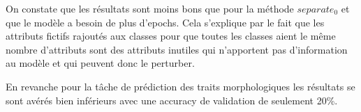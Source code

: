 \documentclass[a4paper]{article}
\begin{document}
On constate que les résultats sont moins bons que pour la méthode $separate_0$ et que le modèle a besoin de 
plus d'epochs. Cela s'explique par le fait que les attributs fictifs rajoutés aux classes 
pour que toutes les classes aient le même nombre d'attributs sont des attributs inutiles qui n'apportent pas 
d'information au modèle et qui peuvent donc le perturber.






En revanche pour la tâche de prédiction des traits morphologiques les résultats se sont avérés bien inférieurs 
avec une accuracy de validation de seulement 20\%.

\newpage

\printbibliography
\end{document}
